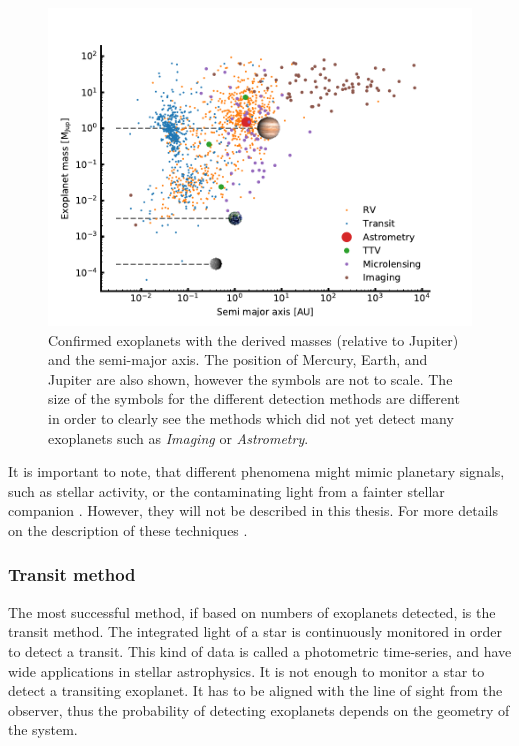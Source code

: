 \begin{figure}[htpb!]
    \centering
    \includegraphics[width=1.0\linewidth]{figures/exoplanetDetectionType.pdf}
    \caption{Confirmed exoplanets with the derived masses (relative to Jupiter) and the semi-major
             axis. The position of Mercury, Earth, and Jupiter are also shown, however the symbols
             are not to scale. The size of the symbols for the different detection methods are
             different in order to clearly see the methods which did not yet detect many exoplanets
             such as \emph{Imaging} or \emph{Astrometry}.}
    \label{fig:detectionTypes}
\end{figure}

It is important to note, that different phenomena might mimic planetary signals, such as stellar
activity, or the contaminating light from a fainter stellar companion \citep[see
e.g.][]{Queloz2001,Oshagh2013,Oshagh2014}. However, they will not be described in this thesis. For
more details on the description of these techniques \citet[see e.g][]{Seager2010}.


\subsubsection{Transit method}
\label{sec:transitMethod}

The most successful method, if based on numbers of exoplanets detected, is the transit method. The
integrated light of a star is continuously monitored in order to detect a transit. This kind of data
is called a photometric time-series, and have wide applications in stellar astrophysics. It is not
enough to monitor a star to detect a transiting exoplanet. It has to be aligned with the line of
sight from the observer, thus the probability of detecting exoplanets depends on the geometry of the
system.


